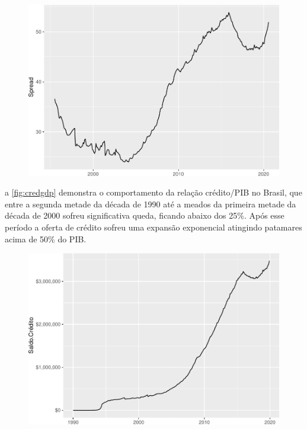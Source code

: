 \documentclass[12pt,openright,oneside,a4paper,chapter=TITLE,section=TITLE,subsection=Title,english,french,spanish,portugues,sumario=tradicional]{04-class-files/abntex2}
\begin{document}
\begin{figure}

\begin{center}\includegraphics{12-exportedfigures/credit gdp-1} \end{center}
\label{fig:credgdp}
\end{figure}

a \autoref{fig:credgdp} demonstra o comportamento da relação crédito/PIB no Brasil, que entre a segunda metade da década de 1990 até a meados da primeira metade da década de 2000 sofreu significativa queda, ficando abaixo dos 25\%. Após esse período a oferta de crédito sofreu uma expansão exponencial atingindo patamares acima de 50\% do PIB.

\begin{figure}

\begin{center}\includegraphics{12-exportedfigures/balance credit-1} \end{center}
\label{fig:saldocredito}
\end{figure}
\end{document}
